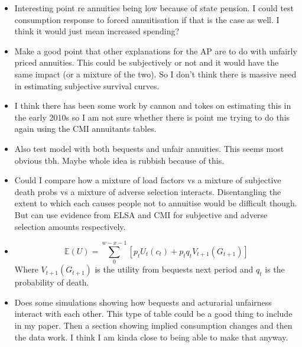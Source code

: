 \documentclass[12pt]{article}
\begin{document}
\begin{itemize}
      \item Interesting point re annuities being low because of state pension. I
            could test consumption response to forced annuitisation if that is
            the case as well. I think it would just mean increased spending?

      \item Make a good point that other explanations for the AP are to do with
            unfairly priced annuities. This could be subjectively or not and it
            would have the same impact (or a mixture of the two). So I don't
            think there is massive need in estimating subjective survival
            curves.

      \item I think there has been some work by cannon and tokes on estimating
            this in the early 2010s so I am not sure whether there is point me
            trying to do this again using the CMI annuitants tables.

      \item Also test model with both bequests and unfair annuities. This seems
            most obvious tbh. Maybe whole idea is rubbish because of this.

      \item Could I compare how a mixture of load factors vs a mixture of
            subjective death probs vs a mixture of adverse selection interacts.
            Disentangling the extent to which each causes people not to
            annuitise would be difficult though. But can use evidence from ELSA
            and CMI for subjective and adverse selection amounts respectively.

      \item \begin{equation*} \mathbb{E}(U) = \sum_{0}^{w - x -
                  1}[p_{t}U_{t}(c_{t}) + p_{t}q_{t}V_{t+1}(G_{t+1})]
            \end{equation*}
            Where $V_{t+1}(G_{t+1})$ is the utility from bequests next period
            and $q_{t}$ is the probability of death.


      \item Does some simulations showing how bequests and acturarial unfairness
            interact with each other. This type of table could be a good thing
            to include in my paper. Then a section showing implied consumption
            changes and then the data work. I think I am kinda close to being
            able to make that anyway.


\end{itemize}
\end{document}
